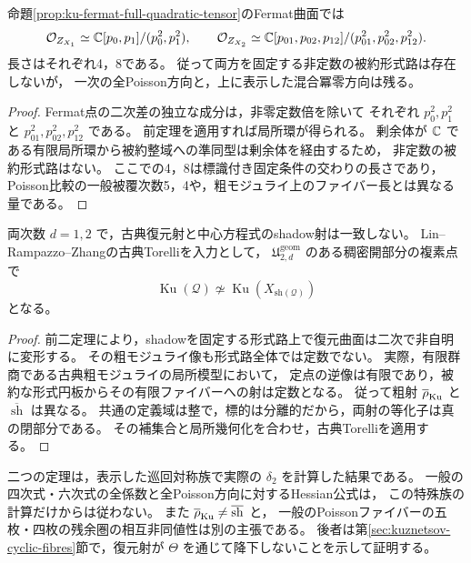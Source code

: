 \begin{corollary}[Fermat点の交わりの完全な局所環]
\label{cor:ku-fermat-intersection-algebra}
命題\ref{prop:ku-fermat-full-quadratic-tensor}のFermat曲面では
\[
 \mathcal O_{Z_{X_1}}\simeq\mathbb C[p_0,p_1]/(p_0^2,p_1^2),\qquad
 \mathcal O_{Z_{X_2}}\simeq
 \mathbb C[p_{01},p_{02},p_{12}]/(p_{01}^2,p_{02}^2,p_{12}^2).
\]
長さはそれぞれ4，8である。
従って両方を固定する非定数の被約形式路は存在しないが，
一次の全Poisson方向と，上に表示した混合冪零方向は残る。
\end{corollary}
\begin{proof}
Fermat点の二次差の独立な成分は，非零定数倍を除いて
それぞれ $p_0^2,p_1^2$ と $p_{01}^2,p_{02}^2,p_{12}^2$ である。
前定理を適用すれば局所環が得られる。
剰余体が $\mathbb C$ である有限局所環から被約整域への準同型は剰余体を経由するため，
非定数の被約形式路はない。
ここでの4，8は標識付き固定条件の交わりの長さであり，
Poisson比較の一般被覆次数5，4や，粗モジュライ上のファイバー長とは異なる量である。
\end{proof}

\begin{corollary}
\label{cor:ku-shadow-nonpreservation}
両次数 $d=1,2$ で，古典復元射と中心方程式のshadow射は一致しない。
Lin--Rampazzo--Zhangの古典Torelliを入力として，
$\mathfrak U^{\mathrm{geom}}_{2,d}$ のある稠密開部分の複素点で
\[
 \operatorname{Ku}(\mathcal Q)
    \not\simeq\operatorname{Ku}(X_{\mathrm{sh}(\mathcal Q)})
\]
となる。
\end{corollary}
\begin{proof}
前二定理により，shadowを固定する形式路上で復元曲面は二次で非自明に変形する。
その粗モジュライ像も形式路全体では定数でない。
実際，有限群商である古典粗モジュライの局所模型において，
定点の逆像は有限であり，被約な形式円板からその有限ファイバーへの射は定数となる。
従って粗射 $\overline\rho_{\rm Ku}$ と $\overline{\operatorname{sh}}$ は異なる。
共通の定義域は整で，標的は分離的だから，両射の等化子は真の閉部分である。
その補集合と局所幾何化を合わせ，古典Torelliを適用する。
\end{proof}

\begin{remark}[この計算の射程]
二つの定理は，表示した巡回対称族で実際の $\delta_2$ を計算した結果である。
一般の四次式・六次式の全係数と全Poisson方向に対するHessian公式は，
この特殊族の計算だけからは従わない。
また $\overline\rho_{\rm Ku}\ne\overline{\operatorname{sh}}$ と，
一般のPoissonファイバーの五枚・四枚の残余圏の相互非同値性は別の主張である。
後者は第\ref{sec:kuznetsov-cyclic-fibres}節で，復元射が $\Theta$ を通じて降下しないことを示して証明する。
\end{remark}
